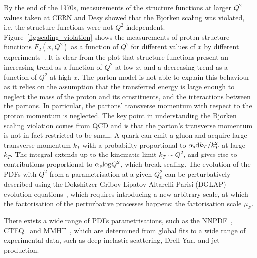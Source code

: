 By the end of the 1970s, measurements of the structure functions at larger $Q^2$ values taken at CERN and Desy showed that the Bjorken scaling was violated, i.e. the structure functions were not $Q^2$ independent. Figure~\ref{fig:scaling_violation} shows the measurements of proton structure functions $F_2(x,Q^2)$ as a function of $Q^2$ for different values of $x$ by different experiments~\cite{pdg}. It is clear from the plot that structure functions present an increasing trend as a function of $Q^2$ at low $x$, and a decreasing trend as a function of $Q^2$ at high $x$. The parton model is not able to explain this behaviour as it relies on the assumption that the transferred energy is large enough to neglect the mass of the proton and its constituents, and the interactions between the partons. In particular, the partons' transverse momentum with respect to the proton momentum is neglected. The key point in understanding the Bjorken scaling violation comes from QCD and is that the parton's transverse momentum is not in fact restricted to be small. A quark can emit a gluon and acquire large transverse momentum $k_T$ with a probability proportional to $\alpha_s \mathrm{d} k_T/k_T^2$ at large $k_T$. The integral extends up to the kinematic limit $k_T\sim Q^2$, and gives rise to contributions proportional to $\alpha_s\mathrm{log}Q^2$, which break scaling. The evolution of the PDFs with $Q^2$ from a parametrisation at a given $Q^2_0$ can be perturbatively described using the Dokshitzer-Gribov-Lipatov-Altarelli-Parisi (DGLAP) evolution equations~\cite{Gribov:1972ri,Dokshitzer:1977sg,Altarelli:1977zs}, which requires introducing a new arbitrary scale, at which the factorisation of the perturbative processes happens: the factorisation scale $\mu_F$.

There exists a wide range of PDFs parametrisations, such as the NNPDF~\cite{NNPDF:2021njg}, CTEQ~\cite{Dulat:2015mca} and MMHT~\cite{Harland-Lang:2014zoa}, which are determined from global fits to a wide range of experimental data, such as deep inelastic scattering, Drell-Yan, and jet production.

